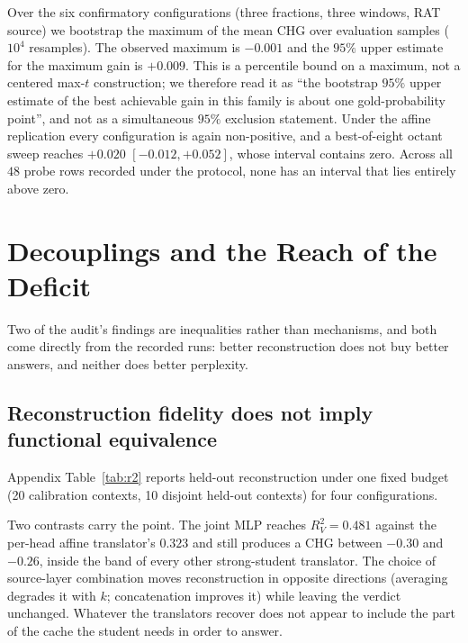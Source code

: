 \documentclass[10pt]{article}
\begin{document}
Over the six confirmatory configurations (three fractions, three windows, RAT
source) we bootstrap the maximum of the mean CHG over evaluation samples
($10^4$ resamples). The observed maximum is $-0.001$ and the $95\%$ upper
estimate for the maximum gain is $+0.009$. This is a percentile bound on a
maximum, not a centered max-$t$ construction; we therefore read it as
``the bootstrap $95\%$ upper estimate of the best achievable gain in this family
is about one gold-probability point'', and not as a simultaneous $95\%$
exclusion statement. Under the affine replication every configuration is again
non-positive, and a best-of-eight octant sweep reaches $+0.020$
$[-0.012,+0.052]$, whose interval contains zero. Across all $48$ probe rows
recorded under the protocol, none has an interval that lies entirely above zero.


\section{Decouplings and the Reach of the Deficit}
\label{sec:analysis}

Two of the audit's findings are inequalities rather than mechanisms, and both
come directly from the recorded runs: better reconstruction does not buy better
answers, and neither does better perplexity.

\subsection{Reconstruction fidelity does not imply functional equivalence}
Appendix Table~\ref{tab:r2} reports held-out reconstruction under one fixed
budget (20 calibration contexts, 10 disjoint held-out contexts) for four
configurations.

Two contrasts carry the point. The joint MLP reaches $R^2_V = 0.481$ against the
per-head affine translator's $0.323$ and still produces a CHG between $-0.30$ and $-0.26$,
inside the band of every other strong-student translator. The choice of
source-layer combination moves reconstruction in opposite directions (averaging
degrades it with $k$; concatenation improves it) while leaving the verdict
unchanged. Whatever the translators recover does not appear to include the part
of the cache the student needs in order to answer.
\end{document}
